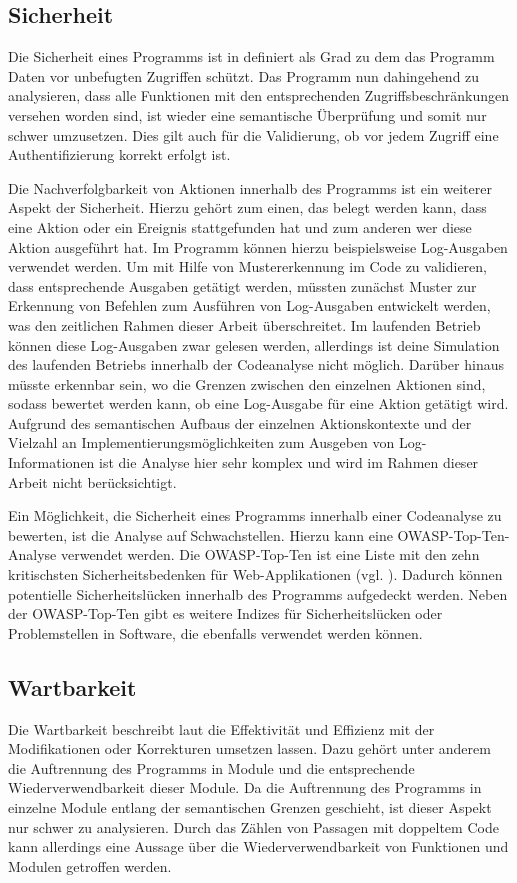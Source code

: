 \documentclass[
	oneside,  %
	ngerman, 
	final, 
	11pt, 
	a4paper, 
	1.1headlines, 
	headinclude=false, 
	footinclude=false, 
	mpinclude=false, 
	pagesize, 
	onecolumn, 
	titlepage, 
	parskip=half, 
	headsepline, 
	chapterprefix=false, 
	version=first, 
	listof=totoc, 
	bibliography=totoc, 
	toc=graduated, 
	fleqn
]{scrbook}
\begin{document}
\subsection{Sicherheit}
Die Sicherheit eines Programms ist in \cite{ISO-25010} definiert als Grad zu dem das Programm Daten vor unbefugten Zugriffen schützt.
Das Programm nun dahingehend zu analysieren, dass alle Funktionen mit den entsprechenden Zugriffsbeschränkungen versehen worden sind, ist wieder eine semantische Überprüfung und somit nur schwer umzusetzen.
Dies gilt auch für die Validierung, ob vor jedem Zugriff eine Authentifizierung korrekt erfolgt ist.

Die Nachverfolgbarkeit von Aktionen innerhalb des Programms ist ein weiterer Aspekt der Sicherheit.
Hierzu gehört zum einen, das belegt werden kann, dass eine Aktion oder ein Ereignis stattgefunden hat und zum anderen wer diese Aktion ausgeführt hat.
Im Programm können hierzu beispielsweise Log-Ausgaben verwendet werden.
Um mit Hilfe von Mustererkennung im Code zu validieren, dass entsprechende Ausgaben getätigt werden, müssten zunächst Muster zur Erkennung von Befehlen zum Ausführen von Log-Ausgaben entwickelt werden, was den zeitlichen Rahmen dieser Arbeit überschreitet.
Im laufenden Betrieb können diese Log-Ausgaben zwar gelesen werden, allerdings ist deine Simulation des laufenden Betriebs innerhalb der Codeanalyse nicht möglich.
Darüber hinaus müsste erkennbar sein, wo die Grenzen zwischen den einzelnen Aktionen sind, sodass bewertet werden kann, ob eine Log-Ausgabe für eine Aktion getätigt wird.
Aufgrund des semantischen Aufbaus der einzelnen Aktionskontexte und der Vielzahl an Implementierungsmöglichkeiten zum Ausgeben von Log-Informationen ist die Analyse hier sehr komplex und wird im Rahmen dieser Arbeit nicht berücksichtigt.

Ein Möglichkeit, die Sicherheit eines Programms innerhalb einer Codeanalyse zu bewerten, ist die Analyse auf Schwachstellen.
Hierzu kann eine \acf{OWASP}-Top-Ten-Analyse verwendet werden. 
Die \acs{OWASP}-Top-Ten ist eine Liste mit den zehn kritischsten Sicherheitsbedenken für Web-Applikationen (vgl. \cite{Ow2020}).
Dadurch können potentielle Sicherheitslücken innerhalb des Programms aufgedeckt werden.
Neben der \acs{OWASP}-Top-Ten gibt es weitere Indizes für Sicherheitslücken oder Problemstellen in Software, die ebenfalls verwendet werden können.

\subsection{Wartbarkeit}
Die Wartbarkeit beschreibt laut \cite{ISO-25010} die Effektivität und Effizienz mit der Modifikationen oder Korrekturen umsetzen lassen.
Dazu gehört unter anderem die Auftrennung des Programms in Module und die entsprechende Wiederverwendbarkeit dieser Module.
Da die Auftrennung des Programms in einzelne Module entlang der semantischen Grenzen geschieht, ist dieser Aspekt nur schwer zu analysieren.
Durch das Zählen von Passagen mit doppeltem Code kann allerdings eine Aussage über die Wiederverwendbarkeit von Funktionen und Modulen getroffen werden.
\end{document}
